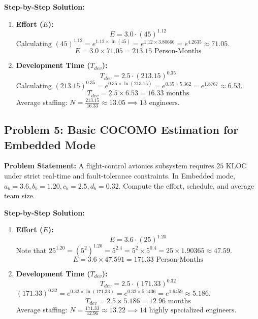 \textbf{Step-by-Step Solution:}
\begin{enumerate}[label=\arabic*.]
    \item \textbf{Effort ($E$):}
    \[
    E = 3.0 \cdot (45)^{1.12}
    \]
    Calculating $(45)^{1.12} = e^{1.12 \times \ln(45)} = e^{1.12 \times 3.80666} = e^{4.2635} \approx 71.05$.
    \[
    E = 3.0 \times 71.05 = 213.15\text{ Person-Months}
    \]
    \item \textbf{Development Time ($T_{dev}$):}
    \[
    T_{dev} = 2.5 \cdot (213.15)^{0.35}
    \]
    Calculating $(213.15)^{0.35} = e^{0.35 \times \ln(213.15)} = e^{0.35 \times 5.362} = e^{1.8767} \approx 6.53$.
    \[
    T_{dev} = 2.5 \times 6.53 = 16.33\text{ months}
    \]
    Average staffing: $N = \frac{213.15}{16.33} \approx 13.05 \implies 13\text{ engineers}$.
\end{enumerate}

\subsection*{Problem 5: Basic COCOMO Estimation for Embedded Mode}
\textbf{Problem Statement:} A flight-control avionics subsystem requires $25\text{ KLOC}$ under strict real-time and fault-tolerance constraints. In Embedded mode, $a_b = 3.6, b_b = 1.20, c_b = 2.5, d_b = 0.32$. Compute the effort, schedule, and average team size.

\textbf{Step-by-Step Solution:}
\begin{enumerate}[label=\arabic*.]
    \item \textbf{Effort ($E$):}
    \[
    E = 3.6 \cdot (25)^{1.20}
    \]
    Note that $25^{1.20} = (5^2)^{1.20} = 5^{2.4} = 5^2 \times 5^{0.4} = 25 \times 1.90365 \approx 47.59$.
    \[
    E = 3.6 \times 47.591 = 171.33\text{ Person-Months}
    \]
    \item \textbf{Development Time ($T_{dev}$):}
    \[
    T_{dev} = 2.5 \cdot (171.33)^{0.32}
    \]
    $(171.33)^{0.32} = e^{0.32 \times \ln(171.33)} = e^{0.32 \times 5.1436} = e^{1.6459} \approx 5.186$.
    \[
    T_{dev} = 2.5 \times 5.186 = 12.96\text{ months}
    \]
    Average staffing: $N = \frac{171.33}{12.96} \approx 13.22 \implies 14\text{ highly specialized engineers}$.
\end{enumerate}

